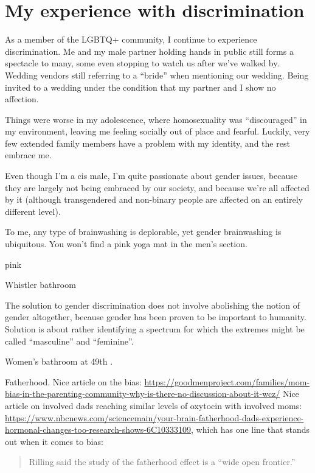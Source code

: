 \documentclass[]{book}
\begin{document}
\hypertarget{my-experience-with-discrimination}{%
\section{My experience with discrimination}\label{my-experience-with-discrimination}}

As a member of the LGBTQ+ community, I continue to experience discrimination. Me and my male partner holding hands in public still forms a spectacle to many, some even stopping to watch us after we've walked by. Wedding vendors still referring to a ``bride'' when mentioning our wedding. Being invited to a wedding under the condition that my partner and I show no affection.

Things were worse in my adolescence, where homosexuality was ``discouraged'' in my environment, leaving me feeling socially out of place and fearful. Luckily, very few extended family members have a problem with my identity, and the rest embrace me.

Even though I'm a cis male, I'm quite passionate about gender issues, because they are largely not being embraced by our society, and because we're all affected by it (although transgendered and non-binary people are affected on an entirely different level).

To me, any type of brainwashing is deplorable, yet gender brainwashing is ubiquitous. You won't find a pink yoga mat in the men's section.

pink

Whistler bathroom

The solution to gender discrimination does not involve abolishing the notion of gender altogether, because gender has been proven to be important to humanity. Solution is about rather identifying a spectrum for which the extremes might be called ``masculine'' and ``feminine''.

Women's bathroom at 49th \textbar\textbar.

Fatherhood. Nice article on the bias: \url{https://goodmenproject.com/families/mom-bias-in-the-parenting-community-why-is-there-no-discussion-about-it-wcz/}
Nice article on involved dads reaching similar levels of oxytocin with involved moms: \url{https://www.nbcnews.com/sciencemain/your-brain-fatherhood-dads-experience-hormonal-changes-too-research-shows-6C10333109}, which has one line that stands out when it comes to bias:

\begin{quote}
Rilling said the study of the fatherhood effect is a ``wide open frontier.''
\end{quote}
\end{document}
